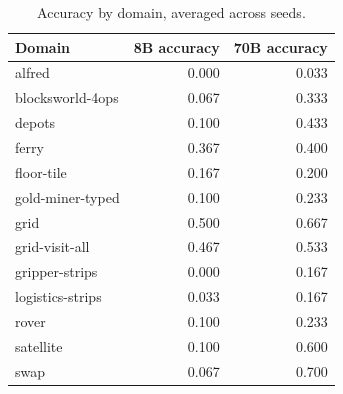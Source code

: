 \begin{table}[ht]
\centering
\caption{Accuracy by domain, averaged across seeds.}
\begin{tabular}{lrr}
\toprule
Domain & 8B accuracy & 70B accuracy \\
\midrule
alfred & 0.000 & 0.033 \\
blocksworld-4ops & 0.067 & 0.333 \\
depots & 0.100 & 0.433 \\
ferry & 0.367 & 0.400 \\
floor-tile & 0.167 & 0.200 \\
gold-miner-typed & 0.100 & 0.233 \\
grid & 0.500 & 0.667 \\
grid-visit-all & 0.467 & 0.533 \\
gripper-strips & 0.000 & 0.167 \\
logistics-strips & 0.033 & 0.167 \\
rover & 0.100 & 0.233 \\
satellite & 0.100 & 0.600 \\
swap & 0.067 & 0.700 \\
\bottomrule
\end{tabular}
\end{table}